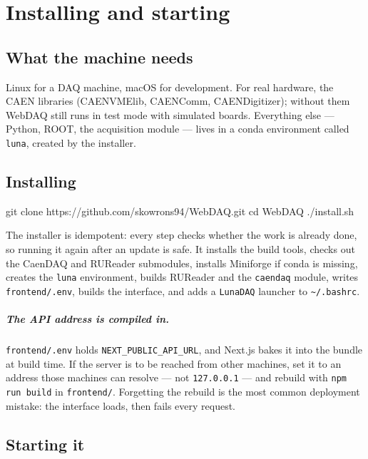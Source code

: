 \documentclass[11pt,a4paper]{report}
\newcommand{\cmd}[1]{\texttt{#1}}
\newcommand{\file}[1]{\texttt{#1}}
\begin{document}
\chapter{Installing and starting}

\section{What the machine needs}

Linux for a DAQ machine, macOS for development. For real hardware, the CAEN
libraries (CAENVMElib, CAENComm, CAENDigitizer); without them WebDAQ still runs
in test mode with simulated boards. Everything else --- Python, ROOT, the
acquisition module --- lives in a conda environment called \cmd{luna}, created by
the installer.

\section{Installing}

\begin{shell}
git clone https://github.com/skowrons94/WebDAQ.git
cd WebDAQ
./install.sh
\end{shell}

The installer is idempotent: every step checks whether the work is already done,
so running it again after an update is safe. It installs the build tools, checks
out the CaenDAQ and RUReader submodules, installs Miniforge if conda is missing,
creates the \cmd{luna} environment, builds RUReader and the \cmd{caendaq} module,
writes \file{frontend/.env}, builds the interface, and adds a \cmd{LunaDAQ}
launcher to \file{\textasciitilde/.bashrc}.

\paragraph{The API address is compiled in.} \file{frontend/.env} holds
\cmd{NEXT\_PUBLIC\_API\_URL}, and Next.js bakes it into the bundle at build time.
If the server is to be reached from other machines, set it to an address those
machines can resolve --- not \cmd{127.0.0.1} --- and rebuild with
\cmd{npm run build} in \file{frontend/}. Forgetting the rebuild is the most common
deployment mistake: the interface loads, then fails every request.

\section{Starting it}
\end{document}
